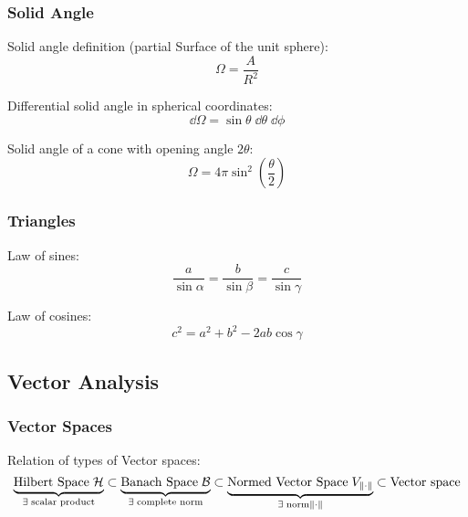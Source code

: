 		\subsubsection{Solid Angle}
			\noindent
			Solid angle definition (partial Surface of the unit sphere):
			\begin{equation}
				\Omega = \frac{A}{R^2}
			\end{equation}

			\noindent
			Differential solid angle in spherical coordinates:
			\begin{equation}
				\dd \Omega = \sin\theta\;\dd \theta \;\dd \phi
			\end{equation}

			\noindent
			Solid angle of a cone with opening angle $2\theta$:
			\begin{equation}
				\Omega = 4\pi\sin^2\left(\frac{\theta}{2}\right)
			\end{equation}

		\subsubsection{Triangles}
			\noindent
			Law of sines:
			\begin{equation}
				\frac{a}{\sin\alpha} = \frac{b}{\sin\beta} = \frac{c}{\sin\gamma}
			\end{equation}

			\noindent
			Law of cosines:
			\begin{equation}
				c^2 = a^2 + b^2 -2ab \cos\gamma
			\end{equation}


	\subsection{Vector Analysis}
		\subsubsection{Vector Spaces}
			Relation of types of Vector spaces:
			\begin{equation}
				\underbrace{\text{Hilbert Space}\;\mathcal{H}}_{\exists\; \text{scalar product}} \subset \underbrace{\text{Banach Space}\;\mathcal{B}}_{\exists\; \text{complete norm}} \subset \underbrace{\text{Normed Vector Space}\;V_{\norm{\cdot}}}_{\exists\; \text{norm} \norm{\cdot} } \subset \text{Vector space}
			\end{equation}

